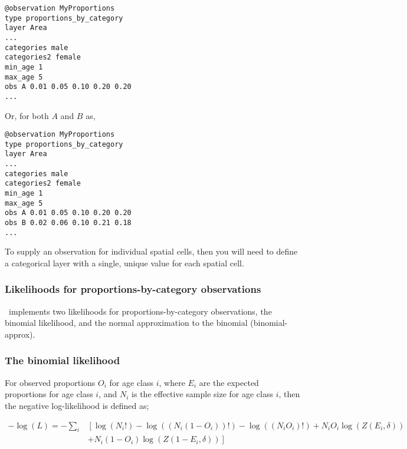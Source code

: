 {{{{{{{\small{\begin{verbatim}
@observation MyProportions
type proportions_by_category
layer Area
...
categories male 
categories2 female
min_age 1
max_age 5
obs A 0.01 0.05 0.10 0.20 0.20
...
\end{verbatim}}}

Or, for both $A$ and $B$ as,

{\small{\begin{verbatim}
@observation MyProportions
type proportions_by_category
layer Area
...
categories male
categories2 female
min_age 1
max_age 5
obs A 0.01 0.05 0.10 0.20 0.20
obs B 0.02 0.06 0.10 0.21 0.18
...
\end{verbatim}}}

To supply an observation for individual spatial cells, then you will need to define a categorical layer with a single, unique value for each spatial cell. 

\subsubsection{Likelihoods for proportions-by-category observations}

\SPM\ implements two likelihoods for proportions-by-category observations, the binomial likelihood, and the normal approximation to the binomial (binomial-approx). 

\subsubsection*{The binomial likelihood}

For observed proportions $O_i$ for age class $i$, where $E_i$ are the expected proportions for age class $i$, and $N_i$ is the effective sample size for age class $i$, then the negative log-likelihood is defined as;  

\begin{equation}
  \begin{split}
    -\log \left(L \right)= -\sum\limits_i & \left[ \right. \log \left(N_i! \right) - \log \left(\left(N_i \left(1 - O_i \right) \right)! \right) - \log \left(\left(N_i O_i \right)! \right) + N_i O_i \log \left(Z\left(E_i,\delta \right) \right) \\
    &+ N_i \left(1 - O_i \right)\log \left(Z\left(1 - E_i,\delta\right) \right) \left. \right]
  \end{split}
\end{equation}


}}}}}}
